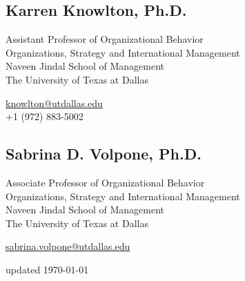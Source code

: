 \documentclass[12pt,letterpaper]{report} %
\begin{document}
    \subsection*{Karren Knowlton, Ph.D.}
        \begin{minipage}[t]{0.700\textwidth}
        Assistant Professor of Organizational Behavior\\
        Organizations, Strategy and International Management\\
        Naveen Jindal School of Management\\
        The University of Texas at Dallas
        \end{minipage}
        \begin{minipage}[t]{0.295\textwidth}
        \flushright{}
        \href{mailto:knowlton@utdallas.edu}{knowlton@utdallas.edu} \\
        +1 (972) 883-5002
        \end{minipage}

    \subsection*{Sabrina D. Volpone, Ph.D.}
        \begin{minipage}[t]{0.700\textwidth}
        Associate Professor of Organizational Behavior\\
        Organizations, Strategy and International Management\\
        Naveen Jindal School of Management\\
        The University of Texas at Dallas
        \end{minipage}
        \begin{minipage}[t]{0.295\textwidth}
        \flushright{}
        \href{mailto:sabrina.volpone@utdallas.edu}{sabrina.volpone@utdallas.edu} \\
        \end{minipage}
        
    \begin{center}
       \vfill
        updated \monthyeardate\today
    \end{center}
\end{document}
